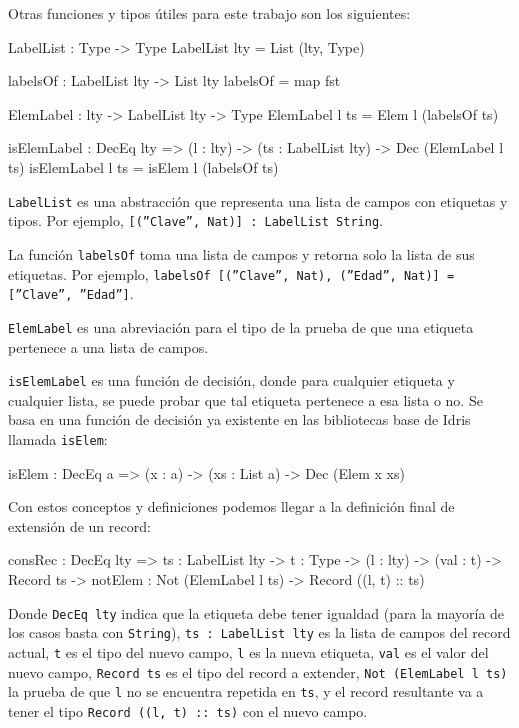 Otras funciones y tipos útiles para este trabajo son los siguientes:

\begin{code}
LabelList : Type -> Type
LabelList lty = List (lty, Type)

labelsOf : LabelList lty -> List lty
labelsOf = map fst

ElemLabel : lty -> LabelList lty -> Type
ElemLabel l ts = Elem l (labelsOf ts)

isElemLabel : DecEq lty => (l : lty) ->
  (ts : LabelList lty) ->
  Dec (ElemLabel l ts)
isElemLabel l ts = isElem l (labelsOf ts)
\end{code}

\texttt{LabelList} es una abstracción que representa una lista de campos con etiquetas y tipos. Por ejemplo, \texttt{[(''Clave'', Nat)] : LabelList String}.

La función \texttt{labelsOf} toma una lista de campos y retorna solo la lista de sus etiquetas. Por ejemplo, \texttt{labelsOf [(''Clave'', Nat), (''Edad'', Nat)] = [''Clave'', ''Edad'']}.

\texttt{ElemLabel} es una abreviación para el tipo de la prueba de que una etiqueta pertenece a una lista de campos.

\texttt{isElemLabel} es una función de decisión, donde para cualquier etiqueta y cualquier lista, se puede probar que tal etiqueta pertenece a esa lista o no. Se basa en una función de decisión ya existente en las bibliotecas base de Idris llamada \texttt{isElem}:

\begin{code}
isElem : DecEq a => (x : a) -> (xs : List a) ->
  Dec (Elem x xs)
\end{code}

Con estos conceptos y definiciones podemos llegar a la definición final de extensión de un record:

\begin{code}
consRec : DecEq lty => {ts : LabelList lty} ->
  {t : Type} -> (l : lty) -> (val : t) ->
  Record ts -> {notElem : Not (ElemLabel l ts)} ->
  Record ((l, t) :: ts)
\end{code}

Donde \texttt{DecEq lty} indica que la etiqueta debe tener igualdad (para la mayoría de los casos basta con \texttt{String}), \texttt{ts : LabelList lty} es la lista de campos del record actual, \texttt{t} es el tipo del nuevo campo, \texttt{l} es la nueva etiqueta, \texttt{val} es el valor del nuevo campo, \texttt{Record ts} es el tipo del record a extender, \texttt{Not (ElemLabel l ts)} la prueba de que \texttt{l} no se encuentra repetida en \texttt{ts}, y el record resultante va a tener el tipo \texttt{Record ((l, t) :: ts)} con el nuevo campo.

